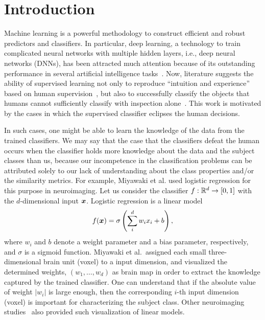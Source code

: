 \section{Introduction}
%
Machine learning is a powerful methodology to construct efficient and robust
predictors and classifiers.
%
In particular, deep learning, a technology to train complicated neural
networks with multiple hidden layers, i.e., deep neural networks (DNNs),
has been attracted much attention because of its outstanding performance in
several artificial intelligence tasks~\cite{krizhevsky2012imagenet,seide2011conversational,DeepFace}.
%
Now, literature suggests the ability of supervised learning not only to reproduce
``intuition and experience'' based on human supervision~\cite{DeepFace},
but also to successfully classify the objects that humans cannot
sufficiently classify with inspection alone~\cite{Horikawa2013,Mural1991}.
%
This work is motivated by the cases in which the supervised
classifier eclipses the human decisions.

%
In such cases, one might be able to learn the knowledge of the data from
the trained classifiers.
%
We may say that the case that the classifiers defeat the human
occurs when the classifier holds more knowledge about the
data and the subject classes than us, because our incompetence in the classification problems
can be attributed solely to our lack of understanding about the class
properties and/or the similarity metrics.
%
For example, Miyawaki et al.\~\cite{miyawaki2008visual} used
logistic regression for this purpose in neuroimaging.
%
Let us consider the classifier $f:\mathbb{R}^{d} \rightarrow [0, 1]$ with the
$d$-dimensional input $\mbox{\boldmath $x$}$.
Logistic regression is a linear model
\begin{equation}
 f(\mbox{\boldmath $x$}) = \sigma \left(\sum_{i}^{d} w_i x_i + b\right),
\end{equation}
where $w_i$ and $b$ denote a
weight parameter and a bias parameter, respectively, and $\sigma$ is a sigmoid function.
%
Miyawaki et al.\ assigned each small three-dimensional brain unit
(voxel) to a input dimension,
and visualized the determined weights, $(w_1, \dots, w_d)$
as brain map in order to extract the knowledge captured by the trained classifier.
%
One can understand that if the absolute value of weight $|w_i|$ is large enough, then the
corresponding $i$-th input dimension (voxel) is important for characterizing the
subject class.
%
Other neuroimaging studies~\cite{LaConte2005,yamashita2008sparse,abraham2014machine} also
provided such visualization of linear models.

